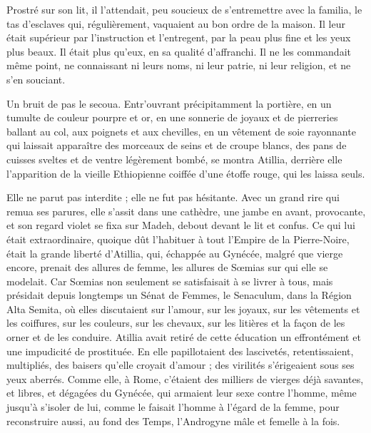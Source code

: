 \documentclass[a4paper, 11pt, oneside, polutonikogreek, french]{article}
\begin{document}
Prostré sur son lit, il l'attendait, peu soucieux de s'entremettre avec la familia, le tas d'esclaves qui, régulièrement, vaquaient au bon ordre de la maison. Il leur était supérieur par l'instruction et l'entregent, par la peau plus fine et les yeux plus beaux. Il était plus qu'eux, en sa qualité d'affranchi. Il ne les commandait même point, ne connaissant ni leurs noms, ni leur patrie, ni leur religion, et ne s'en souciant.

Un bruit de pas le secoua. Entr'ouvrant précipitamment la portière, en un tumulte de couleur pourpre et or, en une sonnerie de joyaux et de pierreries ballant au col, aux poignets et aux chevilles, en un vêtement de soie rayonnante qui laissait apparaître des morceaux de seins et de croupe blancs, des pans de cuisses sveltes et de ventre légèrement bombé, se montra Atillia, derrière elle l'apparition de la vieille Ethiopienne coiffée d'une étoffe rouge, qui les laissa seuls.

Elle ne parut pas interdite ; elle ne fut pas hésitante. Avec un grand rire qui remua ses parures, elle s'assit dans une cathèdre, une jambe en avant, provocante, et son regard violet se fixa sur Madeh, debout devant le lit et confus. Ce qui lui était extraordinaire, quoique dût l'habituer à tout l'Empire de la Pierre-Noire, était la grande liberté d'Atillia, qui, échappée au Gynécée, malgré que vierge encore, prenait des allures de femme, les allures de Sœmias sur qui elle se modelait. Car Sœmias non seulement se satisfaisait à se livrer à tous, mais présidait depuis longtemps un Sénat de Femmes, le Senaculum, dans la Région Alta Semita, où elles discutaient sur l'amour, sur les joyaux, sur les vêtements et les coiffures, sur les couleurs, sur les chevaux, sur les litières et la façon de les orner et de les conduire. Atillia avait retiré de cette éducation un effrontément et une impudicité de prostituée. En elle papillotaient des lascivetés, retentissaient, multipliés, des baisers qu'elle croyait d'amour ; des virilités s'érigeaient sous ses yeux aberrés. Comme elle, à Rome, c'étaient des milliers de vierges déjà savantes, et libres, et dégagées du Gynécée, qui armaient leur sexe contre l'homme, même jusqu'à s'isoler de lui, comme le faisait l'homme à l'égard de la femme, pour reconstruire aussi, au fond des Temps, l'Androgyne mâle et femelle à la fois.
\end{document}
